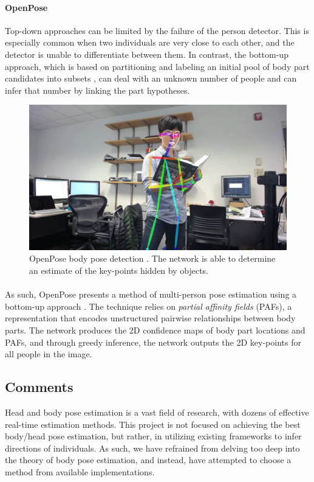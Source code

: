 \paragraph{OpenPose} Top-down approaches can be limited by the failure of the person detector. This is especially common when two individuals are very close to each other, and the detector is unable to differentiate between them. In contrast, the bottom-up approach, which is based on partitioning and labeling an initial pool of body part candidates into subsets \cite{Pishchulin}, can deal with an unknown number of people and can infer that number by linking the part hypotheses.

\begin{figure}[ht]
	\centering
	\includegraphics[width=.7\linewidth]{img/chapter2_background/openpose.jpg}
	\caption{OpenPose body pose detection \cite{Cao2017}. The network is able to determine an estimate of the key-points hidden by objects.}
	\vspace{-1\baselineskip}
\end{figure}

\paragraph{} As such, OpenPose presents a method of multi-person pose estimation using a bottom-up approach \cite{Cao2017}. The technique relies on \textit{partial affinity fields} (PAFs), a representation that encodes unstructured pairwise relationships between body parts. The network produces the 2D confidence maps of body part locations and PAFs, and through greedy inference, the network outputs the 2D key-points for all people in the image.

\subsection{Comments}
Head and body pose estimation is a vast field of research, with dozens of effective real-time estimation methods. This project is not focused on achieving the best body/head pose estimation, but rather, in utilizing existing frameworks to infer directions of individuals. As such, we have refrained from delving too deep into the theory of body pose estimation, and instead, have attempted to choose a method from available implementations.

